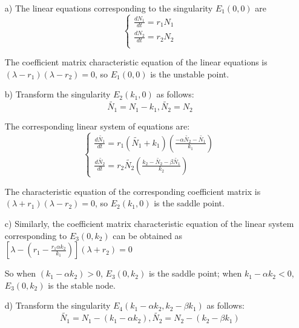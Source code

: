\begin{itemize}
    \item [a)] 
    The linear equations corresponding to the singularity $E_{1}(0,0)$ are
    \begin{equation}\label{}
        \left\{
        \begin{array}{l}
            \frac{dN_{1}}{dt}=r_{1}N_{1} \\
            \frac{dN_{2}}{dt}=r_{2}N_{2} \\
        \end{array}
        \right.
        \end{equation}
    
    The coefficient matrix characteristic equation of the linear equations is $(\lambda-r_{1})(\lambda-r_{2})=0$, so $E_{1}(0,0)$ is the unstable point.

    \item [b)]
    Transform the singularity $E_{2}(k_{1},0)$ as follows:
    \begin{equation}\label{}
        \widetilde{N_{1}}=N_{1}-k_{1},\widetilde{N_{2}}=N_{2}
    \end{equation}

    The corresponding linear system of equations are:
    \begin{equation}\label{}
        \left\{
        \begin{array}{l}
            \frac{d\widetilde{N_{1}}}{dt}=r_{1}(\widetilde{N_{1}}+k_{1})(\frac{-\alpha\widetilde{N_{2}}-\widetilde{N_{1}}}{k_{1}}) \\
            \frac{d\widetilde{N_{2}}}{dt}=r_{2}\widetilde{N_{2}}(\frac{k_{2}-\widetilde{N_{2}}-\beta\widetilde{N_{1}}}{k_{2}})
        \end{array}
        \right.
        \end{equation}

    The characteristic equation of the corresponding coefficient matrix is $(\lambda+r_{1})(\lambda-r_{2})=0$, so $E_{2}(k_{1},0)$ is the saddle point.

    \item [c)]
    Similarly, the coefficient matrix characteristic equation of the linear system corresponding to $E_{3}(0,k_{2})$ can be obtained as $[\lambda-(r_{1}-\frac{r_{1}\alpha k_{2}}{k_{1}})](\lambda+r_{2})=0$

    So when $(k_{1}-\alpha k_{2})>0$, $E_{3}(0,k_{2})$ is the saddle point; when $k_{1}-\alpha k_{2}<0$, $E_{3}(0,k_{2})$ is the stable node.

    \item [d)]
    Transform the singularity $E_{4}(k_{1}-\alpha k_{2},k_{2}-\beta k_{1})$ as follows:
    \begin{equation}\label{}
        \widetilde{N_{1}}=N_{1}-(k_{1}-\alpha k_{2}),\widetilde{N_{2}}=N_{2}-(k_{2}-\beta k_{1})
    \end{equation}


\end{itemize}
